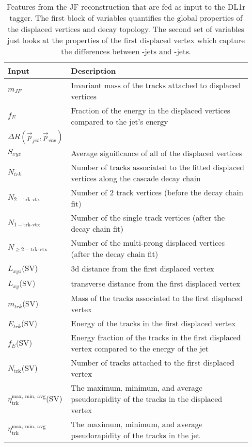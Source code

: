 \begin{table}[h!]
\centering
\begin{tabular}{p{3cm} | p{11cm}  } 
\textbf{Input} & \textbf{Description}  \\
\hline
\hline
	$m_{JF}$ & Invariant mass of the tracks attached to displaced vertices \\
	$f_E$ & Fraction of the energy in the displaced vertices compared to the jet's energy \\
	$\Delta R(\vec{p}_{jet}, \vec{p}_{vtx})$ & \\
	$S_{xyz}$ & Average significance of all of the displaced vertices \\
	$N_{trk}$ & Number of tracks associated to the fitted displaced vertices along the cascade decay chain \\
	$N_{2-\text{trk-vtx}}$ & Number of 2 track vertices (before the decay chain fit) \\
	$N_{1-\text{trk-vtx}}$ & Number of the single track vertices (after the decay chain fit) \\
	$N_{\geq 2-\text{trk-vtx}}$ & Number of the multi-prong displaced vertices (after the decay chain fit) \\
	\hline
	$L_{xyz}$(SV) & 3d distance from the first displaced vertex  \\
	$L_{xy}$(SV) &  transverse distance from the first displaced vertex \\
	$m_{trk}$(SV) & Mass of the tracks associated to the first displaced vertex \\
	$E_{trk}$(SV) & Energy of the tracks in the first displaced vertex \\
	$f_E$(SV) & Energy fraction of the tracks in the first displaced vertex compared to the energy of the jet \\ 
	$N_{\text{trk}}$(SV) & Number of tracks attached to the first displaced vertex \\
	$\eta_{\text{trk}}^{\text{max, min, avg}}$(SV) & The maximum, minimum, and average pseudorapidity of the tracks in the displaced vertex \\
	$\eta_{\text{trk}}^{\text{max, min, avg}}$ & The maximum, minimum, and average pseudorapidity of the tracks in the jet\\	
\end{tabular}
\caption{Features from the JF reconstruction that are fed as input to the DL1r tagger. The first block of variables quantifies the global properties of the displaced vertices and decay topology. The second set of variables just looks at the properties of the first displaced vertex which capture the differences between \Pqb-jets and \Pqc-jets.}
\label{tab:jf-inputs}
\end{table}


